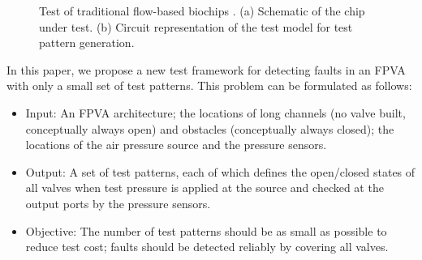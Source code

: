 \begin{figure}[t]
{\figurefontsize
\centering

\caption{Test of traditional flow-based biochips \cite{HuYHC14}. (a)
Schematic of the chip under test. (b) Circuit representation of the test 
model for test pattern generation.}
\label{fig:classic_test}
}
\end{figure}

In this paper, we propose a new test framework for detecting faults in an FPVA
with only a small set of test patterns. This problem can be formulated as follows:
\begin{itemize}

  \item{Input:} An FPVA architecture; the locations of long channels (no valve
    built, conceptually always open) and obstacles (conceptually always
    closed); the locations of the air pressure source and the pressure sensors.

\item{Output:} A set of test patterns, each of which defines the
open/closed states of all valves when test pressure is applied
at the source and checked at the output ports by the pressure sensors.

\item{Objective:} The number of test patterns should be 
  as small as possible to reduce test cost; faults should be detected reliably by
  covering all valves.

\end{itemize}


